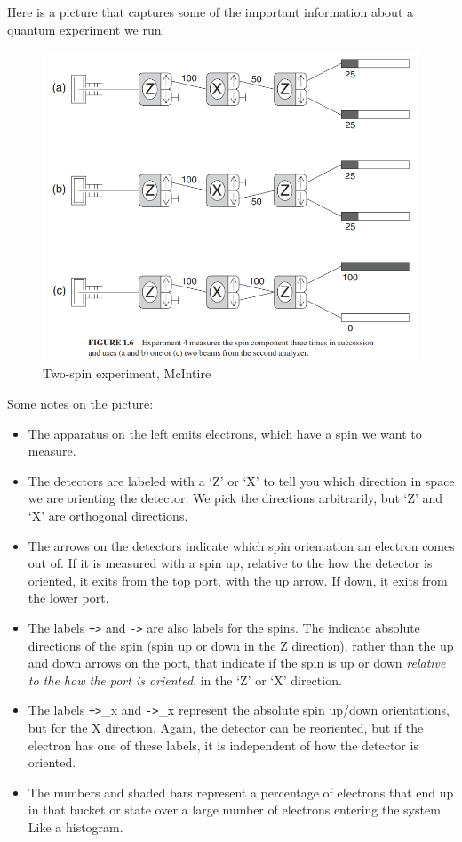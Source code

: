 \documentclass[
]{book}
\providecommand{\tightlist}{%
  \setlength{\itemsep}{0pt}\setlength{\parskip}{0pt}}
\begin{document}
Here is a picture that captures some of the important information about a quantum experiment we run:

\begin{figure}

{\centering \includegraphics[width=0.75\linewidth,height=0.75\textheight]{images/McIntyre_two-spin-experiment} 

}

\caption{Two-spin experiment, McIntire}\label{fig:unnamed-chunk-11}
\end{figure}

Some notes on the picture:

\begin{itemize}
\tightlist
\item
  The apparatus on the left emits electrons, which have a spin we want to measure.
\item
  The detectors are labeled with a `Z' or `X' to tell you which direction in space we are orienting the detector. We pick the directions arbitrarily, but `Z' and `X' are orthogonal directions.
\item
  The arrows on the detectors indicate which spin orientation an electron comes out of. If it is measured with a spin up, relative to the how the detector is oriented, it exits from the top port, with the up arrow. If down, it exits from the lower port.
\item
  The labels \texttt{\textbar{}+\textgreater{}} and \texttt{\textbar{}-\textgreater{}} are also labels for the spins. The indicate absolute directions of the spin (spin up or down in the Z direction), rather than the up and down arrows on the port, that indicate if the spin is up or down \emph{relative to the how the port is oriented}, in the `Z' or `X' direction.
\item
  The labels \texttt{\textbar{}+\textgreater{}}\_x and \texttt{\textbar{}-\textgreater{}}\_x represent the absolute spin up/down orientations, but for the X direction. Again, the detector can be reoriented, but if the electron has one of these labels, it is independent of how the detector is oriented.
\item
  The numbers and shaded bars represent a percentage of electrons that end up in that bucket or state over a large number of electrons entering the system. Like a histogram.
\end{itemize}
\end{document}
